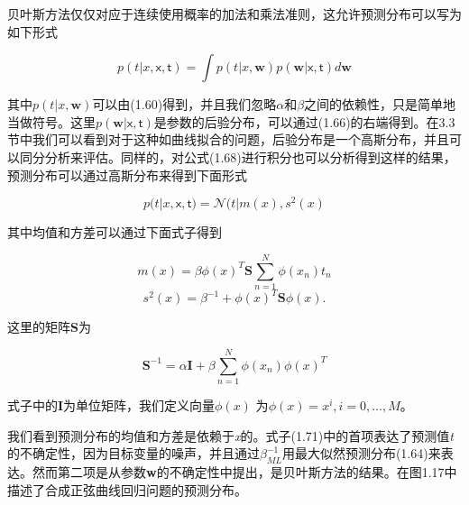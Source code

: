 	贝叶斯方法仅仅对应于连续使用概率的加法和乘法准则，这允许预测分布可以写为如下形式
	
	\begin{equation}
	p(t|x, \mathsf{x}, \mathsf{t}) = \int p(t| x, \textbf{w}) p(\textbf{w}| \mathsf{x}, \mathsf{t})d\textbf{w}
	\end{equation}
	
	其中$p(t|x, \textbf{w})$可以由(1.60)得到，并且我们忽略$\alpha$和$\beta$之间的依赖性，只是简单地当做符号。这里$p(\textbf{w}|\mathsf{x}, \mathsf{t})$是参数的后验分布，可以通过(1.66)的右端得到。在3.3节中我们可以看到对于这种如曲线拟合的问题，后验分布是一个高斯分布，并且可以同分分析来评估。同样的，对公式(1.68)进行积分也可以分析得到这样的结果，预测分布可以通过高斯分布来得到下面形式
	
	\begin{equation}
	p(t|x, \mathsf{x}, \mathsf{t}) = \mathcal{N}(t|m(x),s^2(x)
	\end{equation}
	
	其中均值和方差可以通过下面式子得到
	
	\begin{equation}
	m(x) = \beta \phi (x)^T \textbf{S} \sum_{n = 1}^{N} \phi (x_n) t_n
	\end{equation}
	\begin{equation}
	s^2(x) = \beta^{-1} + \phi (x)^T \textbf{S} \phi (x).
	\end{equation}
	
	这里的矩阵\textbf{S}为
	
	\begin{equation}
	\textbf{S}^{-1} = \alpha \textbf{I} + \beta \sum_{n = 1}^{N} \phi (x_n) \phi (x)^T
	\end{equation}
	
	式子中的\textbf{I}为单位矩阵，我们定义向量$\phi(x)$ 为$\phi (x) = x^i, i = 0, \dots, M$。
	
	我们看到预测分布的均值和方差是依赖于\textit{x}的。式子(1.71)中的首项表达了预测值\textit{t}的不确定性，因为目标变量的噪声，并且通过$\beta_{ML}^{-1}$用最大似然预测分布(1.64)来表达。然而第二项是从参数\textbf{w}的不确定性中提出，是贝叶斯方法的结果。在图1.17中描述了合成正弦曲线回归问题的预测分布。
	
	
